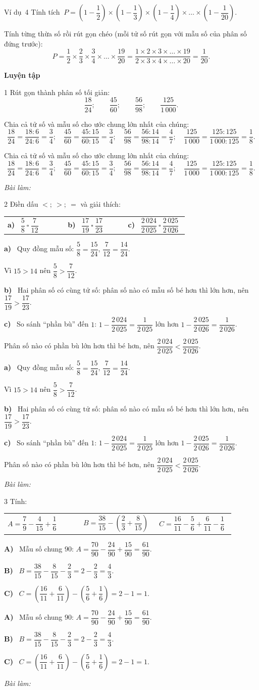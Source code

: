 \documentclass[11pt]{article}
\makeatletter
\newif\ifsol \soltrue
\renewcommand{\arraystretch}{1.35}
\newcommand{\guide}{\par\vspace{4pt}{\bfseries\color{tmBlue}\GuideWord}\par\vspace{3pt}\nopagebreak}
\newcommand{\probsol}[1]{%
  \begin{lrbox}{\solmeasure}\begin{minipage}{\dimexpr\linewidth-24pt\relax}#1\end{minipage}\end{lrbox}%
  \ifsol
    \begin{solbox}#1\end{solbox}%
  \else
    \setlength{\solht}{\dimexpr\ht\solmeasure+\dp\solmeasure+0.85cm\relax}%
    \ifdim\solht<1.35cm\setlength{\solht}{1.35cm}\fi
    \begin{tcolorbox}[colback=white,colframe=Line,boxrule=0.8pt,arc=5pt,
      left=8pt,right=8pt,top=4pt,bottom=4pt,height=\solht]{\footnotesize\color{Slate}\itshape\WorkWord}\end{tcolorbox}%
  \fi}
\newcommand{\dividerbar}[1]{\par\vspace{0.6em}\noindent
  \begin{tcolorbox}[enhanced,frame hidden,interior hidden,borderline west={5pt}{0pt}{ProbBlue},
    colback=white,left=12pt,right=12pt,top=5pt,bottom=5pt,arc=4pt]
  {\large\bfseries\color{ProbBlue} #1}\end{tcolorbox}\vspace{0.4em}}
\newcommand{\pa}[1]{\textbf{#1)}\ }
\newenvironment{cols3}{\par\vspace{3pt}\noindent\setlength{\tabcolsep}{0pt}\renewcommand{\arraystretch}{1.3}%
  \begin{tabular}{@{}>{\raggedright\arraybackslash\rule{0pt}{4.4ex}}p{0.32\linewidth}<{\rule[-2.3ex]{0pt}{0pt}}@{\hspace{0.015\linewidth}}>{\raggedright\arraybackslash\rule{0pt}{4.4ex}}p{0.32\linewidth}<{\rule[-2.3ex]{0pt}{0pt}}@{\hspace{0.015\linewidth}}>{\raggedright\arraybackslash\rule{0pt}{4.4ex}}p{0.32\linewidth}<{\rule[-2.3ex]{0pt}{0pt}}@{}}}%
  {\end{tabular}\par}
\newcommand{\gap}{\vspace{0.3cm}}
\def\GuideWord{Hướng dẫn giải.}
\def\WorkWord{Bài làm:}
\def\ExWord{Ví dụ}
\makeatother
\begin{document}
\gap
\begin{exbox}{\ExWord\ 4}
Tính tích $\ P=\left(1-\dfrac12\right)\times\left(1-\dfrac13\right)\times\left(1-\dfrac14\right)\times\dots\times\left(1-\dfrac1{20}\right)$.
\guide
Tính từng thừa số rồi rút gọn chéo (mỗi tử số rút gọn với mẫu số của phân số đứng trước):
\[P=\frac12\times\frac23\times\frac34\times\dots\times\frac{19}{20}=\frac{1\times2\times3\times\dots\times19}{2\times3\times4\times\dots\times20}=\frac1{20}.\]
\end{exbox}
\dividerbar{Luyện tập}
\begin{probbox}{1}{\relax}
Rút gọn thành phân số tối giản:
\[\frac{18}{24};\qquad\frac{45}{60};\qquad\frac{56}{98};\qquad\frac{125}{1\,000}.\]
\end{probbox}
\probsol{
Chia cả tử số và mẫu số cho ước chung lớn nhất của chúng:
\[\frac{18}{24}=\frac{18:6}{24:6}=\frac34;\quad\frac{45}{60}=\frac{45:15}{60:15}=\frac34;\quad\frac{56}{98}=\frac{56:14}{98:14}=\frac47;\quad\frac{125}{1\,000}=\frac{125:125}{1\,000:125}=\frac18.\]
}
\gap
\begin{probbox}{2}{\relax}
Điền dấu $<;\ >;\ =$ và giải thích:
\begin{cols3}
\pa{a} $\dfrac58\ \square\ \dfrac7{12}$ & \pa{b} $\dfrac{17}{19}\ \square\ \dfrac{17}{23}$ & \pa{c} $\dfrac{2\,024}{2\,025}\ \square\ \dfrac{2\,025}{2\,026}$
\end{cols3}
\end{probbox}
\probsol{
\pa{a} Quy đồng mẫu số: $\dfrac58=\dfrac{15}{24}$, $\dfrac7{12}=\dfrac{14}{24}$.\par Vì $15>14$ nên $\dfrac58>\dfrac7{12}$.\par
\pa{b} Hai phân số có cùng tử số: phân số nào có mẫu số bé hơn thì lớn hơn, nên $\dfrac{17}{19}>\dfrac{17}{23}$.\par
\pa{c} So sánh ``phần bù'' đến $1$: $1-\dfrac{2\,024}{2\,025}=\dfrac1{2\,025}$ lớn hơn $1-\dfrac{2\,025}{2\,026}=\dfrac1{2\,026}$.\par Phân số nào có phần bù lớn hơn thì bé hơn, nên $\dfrac{2\,024}{2\,025}<\dfrac{2\,025}{2\,026}$.
}
\gap
\begin{probbox}{3}{\relax}
Tính:
\begin{cols3}
$A=\dfrac79-\dfrac4{15}+\dfrac16$ & $B=\dfrac{38}{15}-\left(\dfrac23+\dfrac8{15}\right)$ & $C=\dfrac{16}{11}-\dfrac56+\dfrac6{11}-\dfrac16$
\end{cols3}
\end{probbox}
\probsol{
\pa{A} Mẫu số chung $90$: $A=\dfrac{70}{90}-\dfrac{24}{90}+\dfrac{15}{90}=\dfrac{61}{90}$.\par
\pa{B} $B=\dfrac{38}{15}-\dfrac8{15}-\dfrac23=2-\dfrac23=\dfrac43$.\par
\pa{C} $C=\left(\dfrac{16}{11}+\dfrac6{11}\right)-\left(\dfrac56+\dfrac16\right)=2-1=1$.
}
\end{document}
